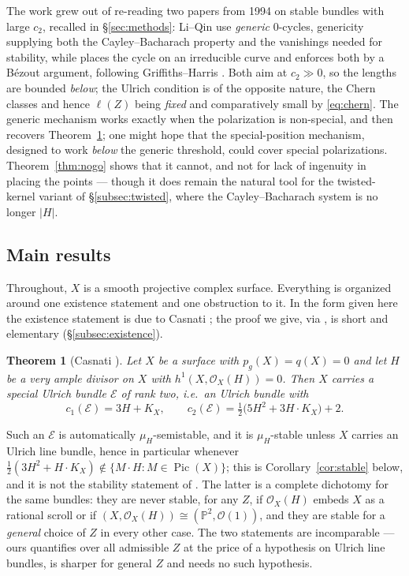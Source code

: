 \documentclass{amsart}
\newtheorem{theorem}{Theorem}[section]
\theoremstyle{definition}
\newcommand{\OO}{\mathcal{O}}
\newcommand{\EE}{\mathcal{E}}
\newcommand{\PP}{\mathbb{P}}
\newcommand{\Pic}{\operatorname{Pic}}
\newcommand{\len}{\ell}
\begin{document}
The work grew out of re-reading two papers from 1994 on stable bundles with large $c_2$, recalled in \S\ref{sec:methods}: Li--Qin \cite{LQ94} use \emph{generic} $0$-cycles, genericity supplying both the Cayley--Bacharach property and the vanishings needed for stability, while \cite{An94} places the cycle on an irreducible curve and enforces both by a B\'ezout argument, following Griffiths--Harris \cite{GH78}. Both aim at $c_2\gg0$, so the lengths are bounded \emph{below}; the Ulrich condition is of the opposite nature, the Chern classes and hence $\len(Z)$ being \emph{fixed} and comparatively small by \eqref{eq:chern}. The generic mechanism works exactly when the polarization is non-special, and then recovers Theorem~\ref{thm:main}; one might hope that the special-position mechanism, designed to work \emph{below} the generic threshold, could cover special polarizations. Theorem~\ref{thm:nogo} shows that it cannot, and not for lack of ingenuity in placing the points --- though it does remain the natural tool for the twisted-kernel variant of \S\ref{subsec:twisted}, where the Cayley--Bacharach system is no longer $|H|$.

\subsection{Main results}\label{subsec:mainresults}
Throughout, $X$ is a smooth projective complex surface. Everything is organized around one existence statement and one obstruction to it. In the form given here the existence statement is due to Casnati \cite{Cas17}; the proof we give, via \cite{LQ94}, is short and elementary (\S\ref{subsec:existence}).

\begin{theorem}[Casnati {\cite[Thm.~1.1]{Cas17}}]\label{thm:main}
Let $X$ be a surface with $p_g(X)=q(X)=0$ and let $H$ be a very ample divisor on $X$ with $h^1(X,\OO_X(H))=0$. Then $X$ carries a special Ulrich bundle $\EE$ of rank two, i.e.\ an Ulrich bundle with
\[
c_1(\EE)=3H+K_X,\qquad c_2(\EE)=\tfrac12\bigl(5H^2+3H\cdot K_X\bigr)+2 .
\]
\end{theorem}

Such an $\EE$ is automatically $\mu_H$-semistable, and it is $\mu_H$-stable unless $X$ carries an Ulrich line bundle, hence in particular whenever $\tfrac12(3H^2+H\cdot K_X)\notin\{M\cdot H:M\in\Pic(X)\}$; this is Corollary~\ref{cor:stable} below, and it is not the stability statement of \cite[Thm.~1.2]{Cas17}. The latter is a complete dichotomy for the same bundles: they are never stable, for any $Z$, if $\OO_X(H)$ embeds $X$ as a rational scroll or if $(X,\OO_X(H))\cong(\PP^2,\OO(1))$, and they are stable for a \emph{general} choice of $Z$ in every other case. The two statements are incomparable --- ours quantifies over all admissible $Z$ at the price of a hypothesis on Ulrich line bundles, \cite[Thm.~1.2]{Cas17} is sharper for general $Z$ and needs no such hypothesis.
\end{document}
